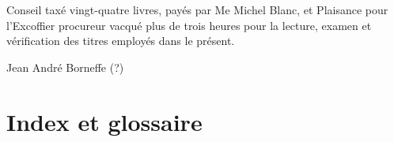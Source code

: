 \documentclass[a4paper,twoside,openany]{article}
\begin{document}
Conseil taxé vingt-quatre livres, payés par Me Michel Blanc, et Plaisance pour l'Excoffier procureur vacqué plus de trois heures pour la lecture, examen et vérification des titres employés dans le présent.

Jean André Borneffe (?)



\section{Index et glossaire}

\printglossary[title=Glossaire]
\printindex[nom]
\printindex[lieu]
\printindex[notion]

\printbibliography
\end{document}

